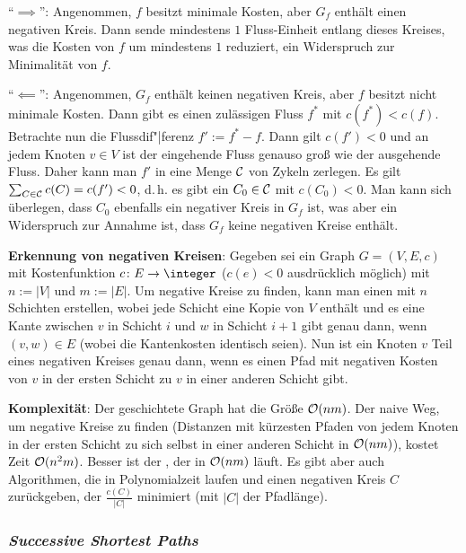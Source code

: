 \begin{Beweis}
    "`$\implies$"':
    Angenommen, $f$ besitzt minimale Kosten, aber $G_f$ enthält einen negativen Kreis.
    Dann sende mindestens $1$ Fluss-Einheit entlang dieses Kreises, was die Kosten von $f$
    um mindestens $1$ reduziert, ein Widerspruch zur Minimalität von $f$.

    "`$\impliedby$"':
    Angenommen, $G_f$ enthält keinen negativen Kreis, aber $f$ besitzt nicht minimale Kosten.
    Dann gibt es einen zulässigen Fluss $f^\ast$ mit $c(f^\ast) < c(f)$.
    Betrachte nun die Flussdif"|ferenz $f' := f^\ast - f$.
    Dann gilt $c(f') < 0$ und an jedem Knoten $v \in V$ ist der eingehende Fluss
    genauso groß wie der ausgehende Fluss.
    Daher kann man $f'$ in eine Menge $\mathcal{C}$ von Zykeln zerlegen.
    Es gilt $\sum_{C \in \mathcal{C}} c(C) = c(f') < 0$,
    d.\,h. es gibt ein $C_0 \in \mathcal{C}$ mit $c(C_0) < 0$.
    Man kann sich überlegen, dass $C_0$ ebenfalls ein negativer Kreis in $G_f$ ist,
    was aber ein Widerspruch zur Annahme ist, dass $G_f$ keine negativen Kreise enthält.
\end{Beweis}

\linie

\textbf{Erkennung von negativen Kreisen}:
Gegeben sei ein Graph $G = (V, E, c)$ mit Kostenfunktion $c\colon E \to \integer$
($c(e) < 0$ ausdrücklich möglich) mit $n := |V|$ und $m := |E|$.
Um negative Kreise zu finden, kann man einen  mit $n$ Schichten
erstellen, wobei jede Schicht eine Kopie von $V$ enthält und es
eine Kante zwischen $v$ in Schicht $i$ und $w$ in Schicht $i+1$ gibt genau dann, wenn
$(v, w) \in E$ (wobei die Kantenkosten identisch seien).
Nun ist ein Knoten $v$ Teil eines negativen Kreises genau dann, wenn
es einen Pfad mit negativen Kosten von $v$ in der ersten Schicht zu $v$ in einer anderen Schicht
gibt.

\textbf{Komplexität}:
Der geschichtete Graph hat die Größe $\mathcal{O}(nm)$.
Der naive Weg, um negative Kreise zu finden (Distanzen mit kürzesten Pfaden von jedem Knoten in
der ersten Schicht zu sich selbst in einer anderen Schicht in $\mathcal{O}(nm)$), kostet Zeit $\mathcal{O}(n^2 m)$.
Besser ist der , der in $\mathcal{O}(nm)$ läuft.
Es gibt aber auch Algorithmen, die in Polynomialzeit laufen und einen negativen Kreis
$C$ zurückgeben, der $\frac{c(C)}{|C|}$ minimiert (mit $|C|$ der Pfadlänge).

\pagebreak

\subsubsection{%
    \emph{Successive Shortest Paths}%
}

